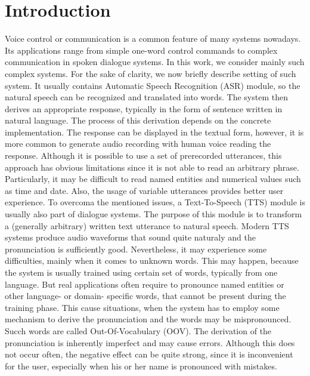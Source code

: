 \chapter{Introduction}
Voice control or communication is a common feature of many systems nowadays.
Its applications range from simple one-word control commands to complex communication in spoken dialogue systems.
In this work, we consider mainly such complex systems.
For the sake of clarity, we now briefly describe setting of such system.
\linebreak\linebreak
It usually contains Automatic Speech Recognition (ASR) module, so the natural speech can be recognized and translated into words.
The system then derives an appropriate response, typically in the form of sentence written in natural language.
The process of this derivation depends on the concrete implementation.
The response can be displayed in the textual form, however, it is more common to generate audio recording with human voice reading the response.
Although it is possible to use a set of prerecorded utterances, this approach has obvious limitations since it is not able to read an arbitrary phrase.
Particularly, it may be difficult to read named entities and numerical values such as time and date.
Also, the usage of variable utterances provides better user experience.
\linebreak\linebreak
To overcoma the mentioned issues, a Text-To-Speech (TTS) module is usually also part of dialogue systems.
The purpose of this module is to transform a (generally arbitrary) written text utterance to natural speech.
Modern TTS systems produce audio waveforms that sound quite naturaly and the pronunciation is sufficiently good.
Nevertheless, it may experience some difficulties, mainly when it comes to unknown words.
This may happen, because the system is usually trained using certain set of words, typically from one language.
But real applications often require to pronounce named entities or other language- or domain- specific words, that cannot be present during the training phase.
This cause situations, when the system has to employ some mechanism to derive the pronunciation and the words may be mispronounced.
Succh words are called Out-Of-Vocabulary (OOV).
The derivation of the pronunciation is inherently imperfect and may cause errors.
Although this does not occur often, the negative effect can be quite strong, since it is inconvenient for the user, especially when his or her name is pronounced with mistakes.
